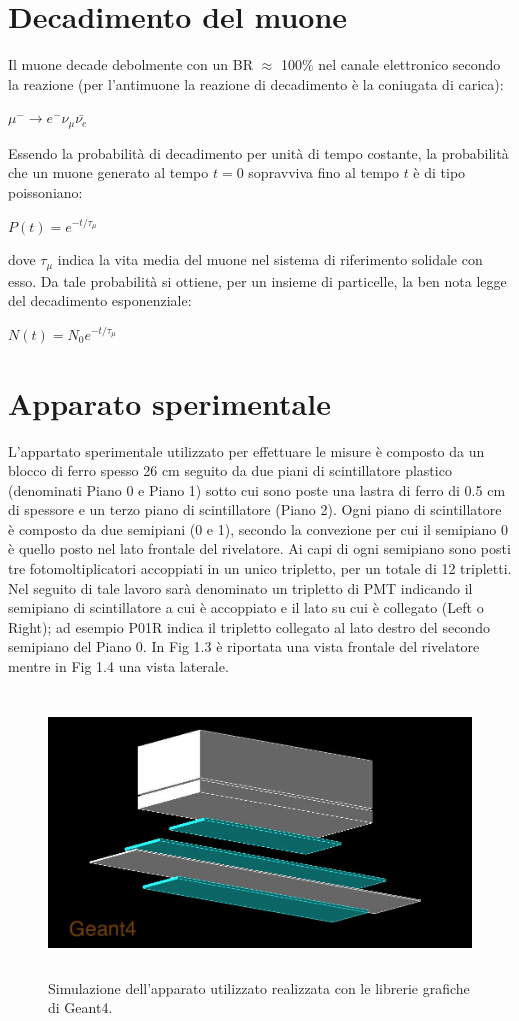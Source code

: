 \documentclass{standalone}
\begin{document}
\section{Decadimento del muone}
Il muone decade debolmente con un BR $\approx$ 100$\%$ nel canale elettronico secondo la reazione (per l'antimuone la reazione di decadimento è la coniugata di carica):\\
\centerline{$\mu^- \rightarrow e^- \nu_\mu \bar{\nu_e}$}
Essendo la probabilità di decadimento per unità di tempo costante, la probabilità che un muone generato al tempo $t=0$ sopravviva fino al tempo $t$ è di tipo poissoniano:\\
\centerline{$P(t)=e^{-t/\tau_\mu}$}
dove $\tau_\mu$ indica la vita media del muone nel sistema di riferimento solidale con esso.
Da tale probabilità si ottiene, per un insieme di particelle, la ben nota legge del decadimento esponenziale:\\
\centerline{$N(t)=N_0e^{-t/\tau_\mu}$}

\section{Apparato sperimentale}
L'appartato sperimentale utilizzato per effettuare le misure è composto da un blocco di ferro spesso 26 cm seguito da due piani di scintillatore plastico (denominati Piano 0 e Piano 1) sotto cui sono poste una lastra di ferro di 0.5 cm di spessore e un terzo piano di scintillatore (Piano 2).
Ogni piano di scintillatore è composto da due semipiani (0 e 1), secondo la convezione per cui il semipiano 0 è quello posto nel lato frontale del rivelatore. Ai capi di ogni semipiano sono posti tre fotomoltiplicatori accoppiati in un unico tripletto, per un totale di 12 tripletti. Nel seguito di tale lavoro sarà denominato un tripletto di PMT indicando il semipiano di scintillatore a cui è accoppiato e il lato su cui è collegato (Left o Right); ad esempio P01R indica il tripletto collegato al lato destro del secondo semipiano del Piano 0.
In Fig 1.3 è riportata una vista frontale del rivelatore mentre in Fig 1.4 una vista laterale.

\begin{figure}[H]
	\centering
  \includegraphics[width=12cm, height=7.5cm]{images/general.jpg}
  \caption{Simulazione dell'apparato utilizzato realizzata con le librerie grafiche di Geant4.}
\end{figure}
\end{document}
